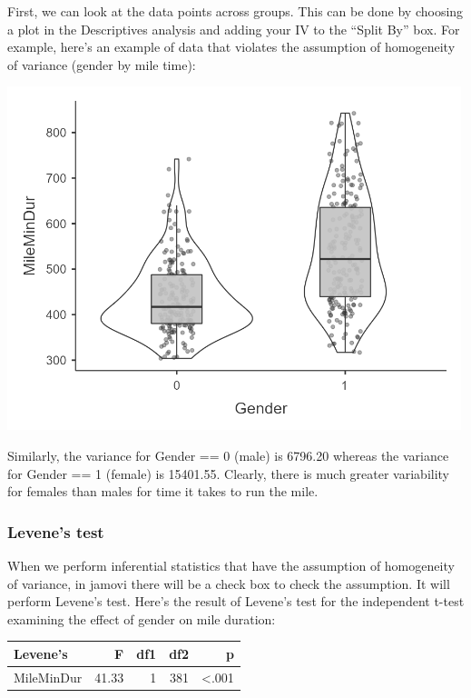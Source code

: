 \documentclass[
]{book}
\begin{document}
First, we can look at the data points across groups. This can be done by choosing a plot in the Descriptives analysis and adding your IV to the ``Split By'' box. For example, here's an example of data that violates the assumption of homogeneity of variance (gender by mile time):

\includegraphics[width=5.20833in,height=\textheight]{images/06-inferential/homogeneity.png}

Similarly, the variance for Gender == 0 (male) is 6796.20 whereas the variance for Gender == 1 (female) is 15401.55. Clearly, there is much greater variability for females than males for time it takes to run the mile.

\hypertarget{levenes-test}{%
\subsubsection{Levene's test}\label{levenes-test}}

When we perform inferential statistics that have the assumption of homogeneity of variance, in jamovi there will be a check box to check the assumption. It will perform Levene's test. Here's the result of Levene's test for the independent t-test examining the effect of gender on mile duration:

\begin{longtable}[]{@{}lrrrr@{}}
\toprule
Levene's & F & df1 & df2 & p \\
\midrule
\endhead
MileMinDur & 41.33 & 1 & 381 & \textless.001 \\
\bottomrule
\end{longtable}
\end{document}
